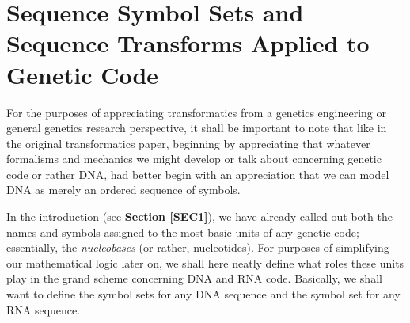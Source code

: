 \documentclass[a4paper, 18pt]{article} %
\begin{document}
\section{Sequence Symbol Sets and Sequence Transforms Applied to Genetic Code}
\label{SEC2}

For the purposes of appreciating transformatics from a genetics engineering or general genetics research perspective, it shall be important to note that like in the original transformatics paper\cite{transformatics}, beginning by appreciating that whatever formalisms and mechanics we might develop or talk about concerning genetic code or rather DNA, had better begin with an appreciation that we can model DNA as merely an ordered sequence of symbols.

In the introduction (see \textbf{Section \ref{SEC1}}), we have already called out both the names and symbols assigned to the most basic units of any genetic code; essentially, the \textit{nucleobases} (or rather, nucleotides). For purposes of simplifying our mathematical logic later on, we shall here neatly define what roles these units play in the grand scheme concerning DNA and RNA code. Basically, we shall want to define the symbol sets for any DNA sequence and the symbol set for any RNA sequence.\\
\end{document}
